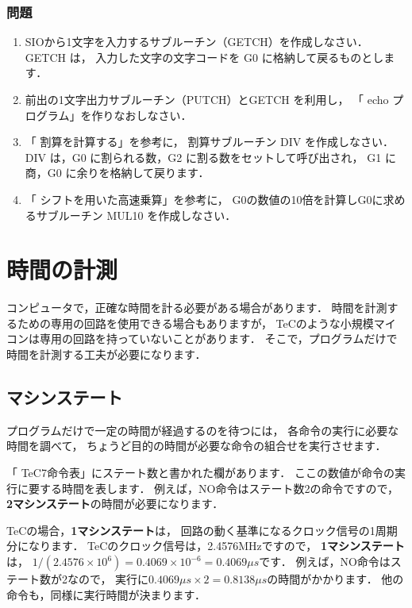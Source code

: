 \vfill
\subsubsection{問題}
\begin{enumerate}
\item SIOから1文字を入力するサブルーチン（GETCH）を作成しなさい．
GETCH は，
入力した文字の文字コードを G0 に格納して戻るものとします．
\item 前出の1文字出力サブルーチン（PUTCH）とGETCH を利用し，
「 echo プログラム」を作りなおしなさい．
\item 「 割算を計算する」を参考に，
割算サブルーチン DIV を作成しなさい．
DIV は，G0 に割られる数，G2 に割る数をセットして呼び出され，
G1 に商，G0 に余りを格納して戻ります．
\item 「 シフトを用いた高速乗算」を参考に，
G0の数値の10倍を計算しG0に求めるサブルーチン MUL10 を作成しなさい．
\end{enumerate}
\vfill

\newpage
\section{時間の計測}

コンピュータで，正確な時間を計る必要がある場合があります．
時間を計測するための専用の回路を使用できる場合もありますが，
TeCのような小規模マイコンは専用の回路を持っていないことがあります．
そこで，プログラムだけで時間を計測する工夫が必要になります．

\subsection{マシンステート}

プログラムだけで一定の時間が経過するのを待つには，
各命令の実行に必要な時間を調べて，
ちょうど目的の時間が必要な命令の組合せを実行させます．

「 TeC7命令表」にステート数と書かれた欄があります．
ここの数値が命令の実行に要する時間を表します．
例えば，NO命令はステート数2の命令ですので，
{\bf 2マシンステート}の時間が必要になります．

TeCの場合，{\bf 1マシンステート}は，
回路の動く基準になるクロック信号の1周期分になります．
TeCのクロック信号は，2.4576MHzですので，
{\bf 1マシンステート}は，
$1/(2.4576\times10^6) = 0.4069\times10^{-6} = 0.4069 \mu s$です．
例えば，NO命令はステート数が2なので，
実行に$0.4069 \mu s \times 2 = 0.8138 \mu s$の時間がかかります．
他の命令も，同様に実行時間が決まります．

